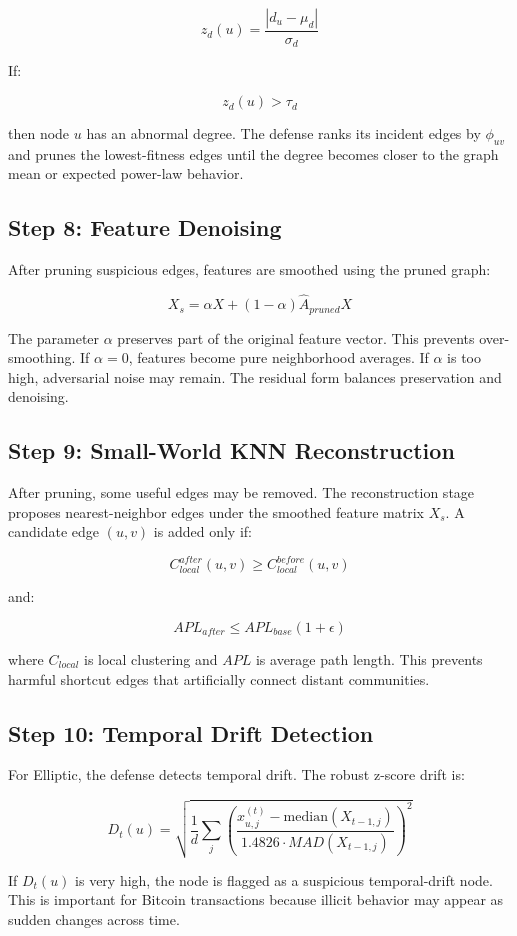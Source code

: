 \documentclass[12pt,a4paper]{article}
\begin{document}
$$
z_d(u)=\frac{|d_u-\mu_d|}{\sigma_d}
$$

If:

$$
z_d(u)>\tau_d
$$

then node $u$ has an abnormal degree. The defense ranks its incident edges by $\phi_{uv}$ and prunes the lowest-fitness edges until the degree becomes closer to the graph mean or expected power-law behavior.

\subsection{Step 8: Feature Denoising}
After pruning suspicious edges, features are smoothed using the pruned graph:

$$
X_s=\alpha X+(1-\alpha)\hat{A}_{pruned}X
$$

The parameter $\alpha$ preserves part of the original feature vector. This prevents over-smoothing. If $\alpha=0$, features become pure neighborhood averages. If $\alpha$ is too high, adversarial noise may remain. The residual form balances preservation and denoising.

\subsection{Step 9: Small-World KNN Reconstruction}
After pruning, some useful edges may be removed. The reconstruction stage proposes nearest-neighbor edges under the smoothed feature matrix $X_s$. A candidate edge $(u,v)$ is added only if:

$$
C_{local}^{after}(u,v)\geq C_{local}^{before}(u,v)
$$

and:

$$
APL_{after}\leq APL_{base}(1+\epsilon)
$$

where $C_{local}$ is local clustering and $APL$ is average path length. This prevents harmful shortcut edges that artificially connect distant communities.

\subsection{Step 10: Temporal Drift Detection}
For Elliptic, the defense detects temporal drift. The robust z-score drift is:

$$
D_t(u)=\sqrt{\frac{1}{d}\sum_j\left(\frac{x_{u,j}^{(t)}-\text{median}(X_{t-1,j})}{1.4826\cdot MAD(X_{t-1,j})}\right)^2}
$$

If $D_t(u)$ is very high, the node is flagged as a suspicious temporal-drift node. This is important for Bitcoin transactions because illicit behavior may appear as sudden changes across time.
\end{document}
